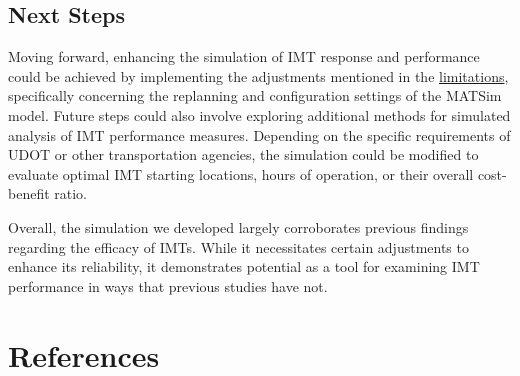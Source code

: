 \documentclass[fancy, oneside, mastersfancy, ms]{byuthesis}
\begin{document}
\hypertarget{sec-next_steps}{%
\section{Next Steps}\label{sec-next_steps}}

Moving forward, enhancing the simulation of IMT response and performance
could be achieved by implementing the adjustments mentioned in the
\protect\hyperlink{sec-limitations}{limitations}, specifically
concerning the replanning and configuration settings of the MATSim
model. Future steps could also involve exploring additional methods for
simulated analysis of IMT performance measures. Depending on the
specific requirements of UDOT or other transportation agencies, the
simulation could be modified to evaluate optimal IMT starting locations,
hours of operation, or their overall cost-benefit ratio.

Overall, the simulation we developed largely corroborates previous
findings regarding the efficacy of IMTs. While it necessitates certain
adjustments to enhance its reliability, it demonstrates potential as a
tool for examining IMT performance in ways that previous studies have
not.


\hypertarget{references}{%
\chapter*{References}\label{references}}

\end{document}
